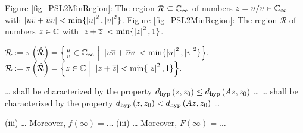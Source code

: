 \begin{description}
{Figure \ref{fig_PSL2MinRegion}: The region $\mathcal{R} \subseteq \mathbb{C}_{\infty}$ of numbers $z = u/v \in \mathbb{C}_{\infty}$ with $\left|u\overline{v} + \overline{u}v\right| < \min\{\left|u\right|^2,\left|v\right|^2\}$.}
{Figure \ref{fig_PSL2MinRegion}: The region $\mathcal{R}$ of numbers $z \in \mathbb{C}$ with $\left|z + \overline{z}\right| < \min\{\left|z\right|^2, 1\}$.}

{$\mathcal{R} := \pi\left(\hat{\mathcal{R}}\right) = 
\Big\{ \frac{u}{v} \in \mathbb{C}_{\infty} \ \Big| \ \left|u\overline{v} + \overline{u}v\right| < \min\{\left|u\right|^2, \left|v\right|^2\} \Big\}.$}
{$\mathcal{R} := \pi\left(\hat{\mathcal{R}}\right) = 
\Big\{ z \in \mathbb{C} \ \Big| \ \left|z + \overline{z}\right| < \min\{\left|z\right|^2, 1\} \Big\}.$}

{\dots{} shall be characterized by the property $d_\text{hyp}\left({z},{z_0}\right) \le d_\text{hyp}\left({Az},{z_0}\right)$ \dots}
{\dots{} shall be characterized by the property $d_\text{hyp}\left({z},{z_0}\right) < d_\text{hyp}\left({Az},{z_0}\right)$ \dots}

{(iii) \dots{} Moreover, \quad $f(\infty) = \dots$}
{(iii) \dots{} Moreover, \quad $F(\infty) = \dots$}

\end{description}
